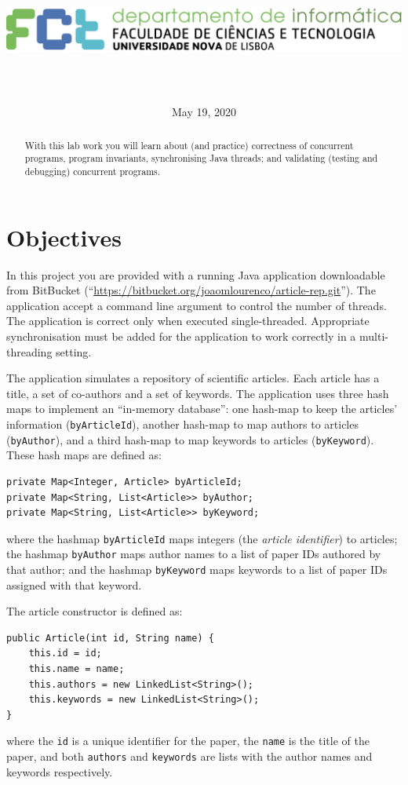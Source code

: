 \documentclass[a4paper,12pt]{article}
\title{\vspace*{-2cm}\includegraphics[width=0.66\linewidth]{logoDIFCTUNL_horiz-transparente}\\[5ex]{\LARGE\mycourse}\\{\Large\mytitle}}
\author{\myauthor}
\date{May 19, 2020}
\begin{document}
\maketitle

\begin{abstract}
With this lab work you will learn about (and practice) correctness of concurrent programs, program invariants, synchronising Java threads; and validating (testing and debugging) concurrent programs.
\end{abstract}



\section{Objectives} %
\label{sec:objectives}

In this project you are provided with a running Java application downloadable from BitBucket (“\url{https://bitbucket.org/joaomlourenco/article-rep.git}”). The application accept a command line argument to control the number of threads. The application is correct only when executed single-threaded. Appropriate synchronisation must be added for the application to work correctly in a multi-threading setting.

The application simulates a repository of scientific articles.  Each article has a title, a set of co-authors and a set of keywords. The application uses three hash maps to implement an “in-memory database”: one hash-map to keep the articles’ information (\verb!byArticleId!), another hash-map to map authors to articles (\verb!byAuthor!), and a third hash-map to map keywords to articles (\verb!byKeyword!).  These hash maps are defined as:
\begin{lstlisting}
private Map<Integer, Article> byArticleId;  
private Map<String, List<Article>> byAuthor;
private Map<String, List<Article>> byKeyword;
\end{lstlisting}
\noindent where the hashmap \verb!byArticleId! maps integers (the \emph{article identifier}) to articles; the hashmap \verb!byAuthor! maps author names to a list of paper IDs authored by that author; and the hashmap \verb!byKeyword! maps keywords to a list of paper IDs assigned with that keyword.

The article constructor is defined as:
\begin{lstlisting}
public Article(int id, String name) {
    this.id = id;
    this.name = name;
    this.authors = new LinkedList<String>();
    this.keywords = new LinkedList<String>();
}
\end{lstlisting}
\noindent where the \verb!id! is a unique identifier for the paper, the \verb!name! is the title of the paper, and both \verb!authors! and \verb!keywords! are lists with the author names and keywords respectively.
\end{document}
